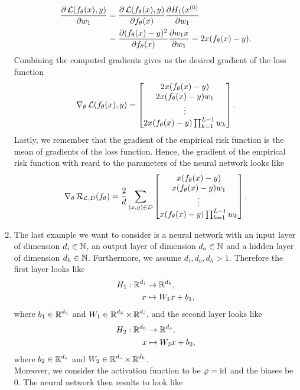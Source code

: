 \begin{example}
\begin{enumerate}
\begin{align*}
\frac{\partial \operatorname{\mathcal{L}} (f_{\theta}(x), y)}{ \partial w_1} &= \frac{\partial \operatorname{\mathcal{L}} (f_{\theta}(x), y)}{\partial f_{\theta}(x)} \frac{\partial H_1(x^{(0)}}{ \partial w_1}\\
&= \frac{\partial  (f_{\theta}(x) - y)^2}{\partial f_{\theta}(x)} \frac{\partial w_1x}{ \partial w_1} = 2x (f_{\theta}(x) - y).
\end{align*}
Combining the computed gradients gives us the desired gradient of the loss function
\begin{align*}
\nabla_\theta \operatorname{\mathcal{L}} (f_{\theta}(x), y) = \left[\begin{matrix}
2x (f_{\theta}(x) - y)\\
2x (f_{\theta}(x) - y) w_1\\
\vdots\\
2x (f_{\theta}(x) - y) \prod_{k=1}^{L-1} w_k
\end{matrix} \right].
\end{align*}
Lastly, we remember that the gradient of the empirical risk function is the mean of gradients of the loss function. Hence, the gradient of the empirical risk function with reard to the parameters of the neural network looks like
\begin{align*}
\nabla_{\theta}\operatorname{\mathcal{R}}_{\operatorname{\mathcal{L}}, D} (f_{\theta}) = \frac{2}{d} \sum_{(x, y)\in D} \left[\begin{matrix}
x (f_{\theta}(x) - y)\\
x (f_{\theta}(x) - y) w_1\\
\vdots\\
x (f_{\theta}(x) - y) \prod_{k=1}^{L-1} w_k
\end{matrix} \right].
\end{align*}
\iffalse
\item The last example we want to consider is a neural network with an input layer of dimension $d_i\in\operatorname{\mathbb{N}}$, an output layer of dimension $d_o\in\operatorname{\mathbb{N}}$ and a hidden layer of dimension  $d_h\in\operatorname{\mathbb{N}}$. Furthermore, we assume $d_i, d_o, d_h > 1$. Therefore the first layer looks like
\begin{align*}
H_1: \operatorname{\mathbb{R}}^{d_i} &\to \operatorname{\mathbb{R}}^{d_h},\\
x &\mapsto W_1x + b_1,
\end{align*}
where $b_1\in\operatorname{\mathbb{R}}^{d_h}$ and $W_1\in\operatorname{\mathbb{R}}^{d_h}\times\operatorname{\mathbb{R}}^{d_i}$, and the second layer looks like
\begin{align*}
H_2: \operatorname{\mathbb{R}}^{d_h} &\to \operatorname{\mathbb{R}}^{d_o},\\
x &\mapsto W_2x + b_2,
\end{align*}
where $b_2\in\operatorname{\mathbb{R}}^{d_o}$ and $W_2\in\operatorname{\mathbb{R}}^{d_o}\times\operatorname{\mathbb{R}}^{d_h}$.\\
Moreover, we consider the activation function to be $\operatorname{\varphi}=\mathrm{id}$ and the biases be $0$. The neural network then results to look like

\end{enumerate}
\end{example}
